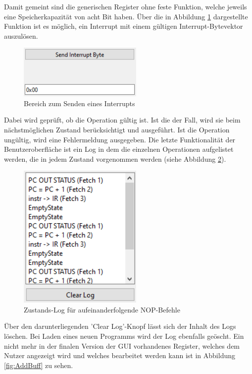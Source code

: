 \documentclass[12pt]{article}
\newcommand{\imgSpaceBefore}{\vspace{10pt}}
\begin{document}
\noindent
Damit gemeint sind die generischen Register ohne feste Funktion, welche jeweils eine Speicherkapazität von acht Bit haben. Über die in Abbildung \ref{fig:Interrupt} dargestellte Funktion ist es möglich, ein Interrupt mit einem gültigen Interrupt-Bytevektor auszulösen.\imgSpaceBefore

\begin{figure}[h]
\centering
\includegraphics[width=6cm]{bilder/Interrupt}
\caption{Bereich zum Senden eines Interrupts}
\label{fig:Interrupt}
\end{figure}

\noindent
Dabei wird geprüft, ob die Operation gültig ist. Ist die der Fall, wird sie beim nächstmöglichen Zustand berücksichtigt und ausgeführt. Ist die Operation ungültig, wird eine Fehlermeldung ausgegeben.
\newpage
\noindent
Die letzte Funktionalität der Benutzeroberfläche ist ein Log in dem die einzelnen Operationen aufgelistet werden, die in jedem Zustand vorgenommen werden (siehe Abbildung \ref{fig:Logger}).\imgSpaceBefore

\begin{figure}[h]
\centering
\includegraphics[width=6cm]{bilder/Logger}
\caption{Zustands-Log für aufeinanderfolgende NOP-Befehle}
\label{fig:Logger}
\end{figure}

\noindent
Über den darunterliegenden 'Clear Log'-Knopf lässt sich der Inhalt des Logs löschen. Bei Laden eines neuen Programms wird der Log ebenfalls geöscht. Ein nicht mehr in der finalen Version der GUI vorhandenes Register, welches dem Nutzer angezeigt wird und welches bearbeitet werden kann ist in Abbildung \ref{fig:AddBuff} zu sehen.\imgSpaceBefore
\end{document}
